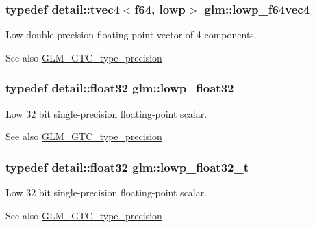 \subsubsection[{\texorpdfstring{lowp\+\_\+f64vec4}{lowp_f64vec4}}]{\setlength{\rightskip}{0pt plus 5cm}typedef detail\+::tvec4$<$f64, lowp$>$ {\bf glm\+::lowp\+\_\+f64vec4}}\hypertarget{group__gtc__type__precision_gaf99497c42a2d011fecab7f3f2312213d}{}\label{group__gtc__type__precision_gaf99497c42a2d011fecab7f3f2312213d}
Low double-\/precision floating-\/point vector of 4 components. \begin{DoxySeeAlso}{See also}
\hyperlink{group__gtc__type__precision}{G\+L\+M\+\_\+\+G\+T\+C\+\_\+type\+\_\+precision} 
\end{DoxySeeAlso}
\subsubsection[{\texorpdfstring{lowp\+\_\+float32}{lowp_float32}}]{\setlength{\rightskip}{0pt plus 5cm}typedef detail\+::float32 {\bf glm\+::lowp\+\_\+float32}}\hypertarget{group__gtc__type__precision_ga92be8087f3c84504f3a44af1a9efc51e}{}\label{group__gtc__type__precision_ga92be8087f3c84504f3a44af1a9efc51e}
Low 32 bit single-\/precision floating-\/point scalar. \begin{DoxySeeAlso}{See also}
\hyperlink{group__gtc__type__precision}{G\+L\+M\+\_\+\+G\+T\+C\+\_\+type\+\_\+precision} 
\end{DoxySeeAlso}
\subsubsection[{\texorpdfstring{lowp\+\_\+float32\+\_\+t}{lowp_float32_t}}]{\setlength{\rightskip}{0pt plus 5cm}typedef detail\+::float32 {\bf glm\+::lowp\+\_\+float32\+\_\+t}}\hypertarget{group__gtc__type__precision_gadfb453b23cb820e3e4e766e047c67dab}{}\label{group__gtc__type__precision_gadfb453b23cb820e3e4e766e047c67dab}
Low 32 bit single-\/precision floating-\/point scalar. \begin{DoxySeeAlso}{See also}
\hyperlink{group__gtc__type__precision}{G\+L\+M\+\_\+\+G\+T\+C\+\_\+type\+\_\+precision} 
\end{DoxySeeAlso}
